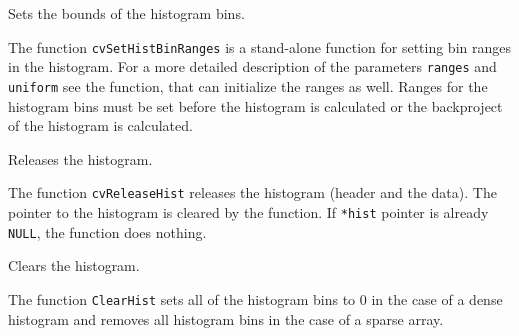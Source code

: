 \ifC
{}\label{SetHistBinRanges}

Sets the bounds of the histogram bins.


\begin{description}
\end{description}

The function \texttt{cvSetHistBinRanges} is a stand-alone function for setting bin ranges in the histogram. For a more detailed description of the parameters \texttt{ranges} and \texttt{uniform} see the  function, that can initialize the ranges as well. Ranges for the histogram bins must be set before the histogram is calculated or the backproject of the histogram is calculated.
\fi

\ifC
{}\label{ReleaseHist}

Releases the histogram.


\begin{description}
\end{description}

The function \texttt{cvReleaseHist} releases the histogram (header and the data). The pointer to the histogram is cleared by the function. If \texttt{*hist} pointer is already \texttt{NULL}, the function does nothing.
\fi

\label{ClearHist}

Clears the histogram.


\begin{description}
\end{description}

The function \texttt{ClearHist} sets all of the histogram bins to 0 in the case of a dense histogram and removes all histogram bins in the case of a sparse array.

\ifC
{}\label{MakeHistHeaderForArray}

